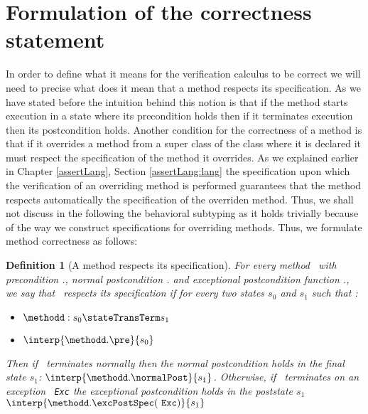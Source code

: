 \newtheorem{defCorrect}{Definition}[section]
\newtheorem{vcGenCorrect}{Theorem}[section]

\section{Formulation of the correctness statement}\label{proof:defineCorrect}

In order to define what it means for the verification calculus to be correct we will need to 
 precise what does it mean that a  method respects its specification. As we have stated 
 before the intuition behind this notion is that if the method starts execution in a state 
 where its precondition  holds then if it terminates execution then its postcondition holds.
 Another condition for the correctness of a method is that if it overrides a method from a super class
 of the class where it is declared  it must respect the specification of the method it overrides. As we explained 
 earlier in Chapter \ref{assertLang}, Section \ref{assertLang:lang} the specification upon which the verification 
 of an overriding method is performed guarantees that the method respects automatically the specification of the overriden method.
 Thus, we shall not discuss in the following the behavioral subtyping as it holds trivially because of the way we construct specifications 
 for overriding methods. Thus, we formulate method correctness as follows:

\begin{defCorrect}[A method respects its specification] \label{defCorrect}
For every method \methodd \ with precondition \methodd.\pre, normal postcondition \methodd.\normalPost
and exceptional postcondition function \methodd.\excPostSpec, we say that \methodd \ respects its specification if 
for every two states $s_0$ and $s_1$ such that :
\begin{itemize}
      
      \item   $\methodd : s_0  \stateTransTerm s_1   $
      \item   $ \interp{\methodd.\pre }{ s_0 }$
\end{itemize}
Then if \methodd \ terminates normally then the normal postcondition holds in the final state $s_1 $:  $\interp{\methodd.\normalPost}{s_1}$. 
Otherwise, if  \methodd \ terminates on an exception \mbox{ \rm \texttt{Exc}} the exceptional postcondition holds in the poststate $s_1 $
$ \interp{\methodd.\excPostSpec(  \mbox{ \rm \texttt{Exc}} )}{s_1} $
\end{defCorrect}


